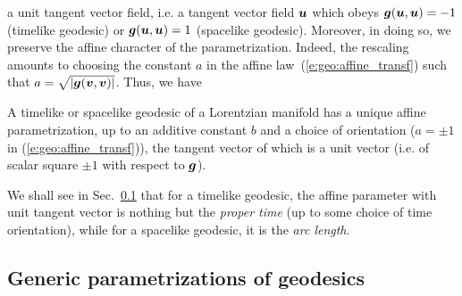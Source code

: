 a unit tangent vector field, i.e. a tangent vector field $\bm{u}$ which obeys
$\bm{g}(\bm{u},\bm{u}) = -1$ (timelike geodesic) or $\bm{g}(\bm{u},\bm{u}) = 1$
(spacelike geodesic). Moreover, in doing so, we preserve the affine character of the
parametrization. Indeed, the rescaling amounts to choosing the constant $a$
in the affine law~(\ref{e:geo:affine_transf}) such that $a = \sqrt{|\bm{g}(\bm{v},\bm{v})|}$.
Thus, we have
\begin{greybox}
A timelike or spacelike geodesic of a Lorentzian manifold has a unique affine parametrization,
up to an additive constant $b$ and a choice of orientation ($a=\pm 1$ in (\ref{e:geo:affine_transf})),
the tangent vector of which is a unit vector (i.e. of scalar square $\pm 1$ with respect to
$\bm{g}$).
\end{greybox}
We shall see in Sec.~\ref{s:geo:gener_param} that for a timelike geodesic,
the affine parameter with unit tangent vector is nothing but the
\emph{proper time} (up to some choice of
time orientation), while for a spacelike
geodesic, it is the \emph{arc length}.

\subsection{Generic parametrizations of geodesics} \label{s:geo:gener_param}


